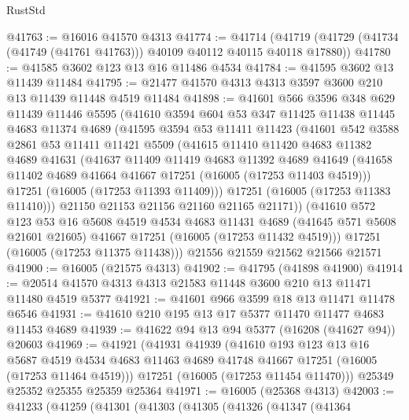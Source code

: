 \begin{lexlean}{RustStd}
\begin{coremodule}
@41763 := @16016 @41570 @4313
@41774 := @41714
    (@41719 (@41729 (@41734 (@41749 (@41761 @41763))) @40109 @40112 @40115 @40118 @17880))
@41780 := @41585 @3602 @123 @13 @16 @11486 @4534
@41784 := @41595 @3602 @13 @11439 @11484
@41795 := @21477 @41570 @4313 @4313 @3597 @3600 @210 @13 @11439 @11448 @4519 @11484
@41898 := @41601
    @566
    @3596
    @348
    @629
    @11439
    @11446
    @5595
    (@41610
      @3594
      @604
      @53
      @347
      @11425
      @11438
      @11445
      @4683
      @11374
      @4689
      (@41595
        @3594
        @53
        @11411
        @11423
        (@41601
          @542
          @3588
          @2861
          @53
          @11411
          @11421
          @5509
          (@41615
            @11410
            @11420
            @4683
            @11382
            @4689
            @41631
            (@41637
              @11409
              @11419
              @4683
              @11392
              @4689
              @41649
              (@41658 @11402 @4689 @41664 @41667 @17251 (@16005 (@17253 @11403 @4519)))
              @17251
              (@16005 (@17253 @11393 @11409)))
            @17251
            (@16005 (@17253 @11383 @11410)))
          @21150
          @21153
          @21156
          @21160
          @21165
          @21171))
      (@41610
        @572
        @123
        @53
        @16
        @5608
        @4519
        @4534
        @4683
        @11431
        @4689
        (@41645 @571 @5608 @21601 @21605)
        @41667
        @17251
        (@16005 (@17253 @11432 @4519)))
      @17251
      (@16005 (@17253 @11375 @11438)))
    @21556
    @21559
    @21562
    @21566
    @21571
@41900 := @16005 (@21575 @4313)
@41902 := @41795 (@41898 @41900)
@41914 := @20514 @41570 @4313 @4313 @21583 @11448 @3600 @210 @13 @11471 @11480 @4519 @5377
@41921 := @41601 @966 @3599 @18 @13 @11471 @11478 @6546
@41931 := @41610 @210 @195 @13 @17 @5377 @11470 @11477 @4683 @11453 @4689
@41939 := @41622 @94 @13 @94 @5377 (@16208 (@41627 @94)) @20603
@41969 := @41921
    (@41931
      @41939
      (@41610
        @193
        @123
        @13
        @16
        @5687
        @4519
        @4534
        @4683
        @11463
        @4689
        @41748
        @41667
        @17251
        (@16005 (@17253 @11464 @4519)))
      @17251
      (@16005 (@17253 @11454 @11470)))
    @25349
    @25352
    @25355
    @25359
    @25364
@41971 := @16005 (@25368 @4313)
@42003 := @41233
    (@41259
      (@41301
        (@41303
          (@41305
            (@41326
              (@41347
                (@41364

\end{coremodule}
\end{lexlean}
